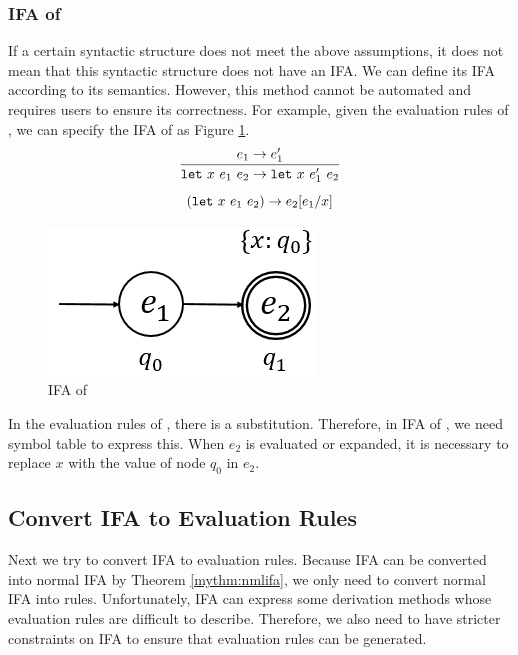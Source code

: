 \subsubsection{IFA of }

If a certain syntactic structure does not meet the above assumptions, it does not mean that this syntactic structure does not have an IFA. We can define its IFA according to its semantics. However, this method cannot be automated and requires users to ensure its correctness. For example, given the evaluation rules of , we can specify the IFA of  as Figure \ref{fig:ifa-let}.
\[
\infer{\m{let}~x~e_1~e_2 \to \m{let}~x~e_1'~e_2}{e_1 \to e_1'}
\]\[
(\mbox{\tt let}~x~e_1~e_2) \to e_2[e_1/x]
\]


\begin{figure}[t]
    \centering
    \includegraphics[scale=0.25]{images/ifa/ifa-let.png}
    \caption{IFA of }
    \label{fig:ifa-let}
\end{figure}

In the evaluation rules of , there is a substitution. Therefore, in IFA of , we need symbol table to express this. When $e_2$ is evaluated or expanded, it is necessary to replace $x$ with the value of node $q_0$ in $e_2$.




\subsection{Convert IFA to Evaluation Rules}

Next we try to convert IFA to evaluation rules. Because IFA can be converted into normal IFA by Theorem \ref{mythm:nmlifa}, we only need to convert normal IFA into rules. Unfortunately, IFA can express some derivation methods whose evaluation rules are difficult to describe. Therefore, we also need to have stricter constraints on IFA to ensure that evaluation rules can be generated.

